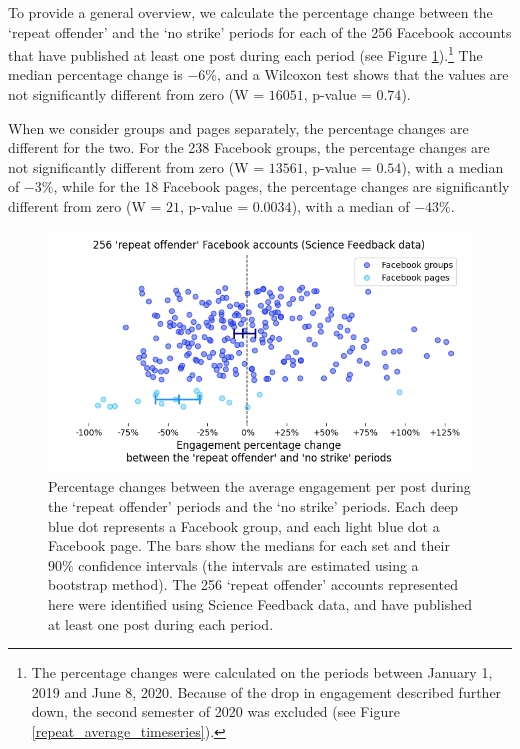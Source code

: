 \documentclass[review]{elsarticle}
\begin{document}
To provide a general overview, we calculate the percentage change between the `repeat offender' and the `no strike' periods for each of the 256 Facebook accounts that have published at least one post during each period (see Figure \ref{repeat_vs_free_percentage_change}).\footnote{The percentage changes were calculated on the periods between January 1, 2019 and June 8, 2020. Because of the drop in engagement described further down, the second semester of 2020 was excluded (see Figure \ref{repeat_average_timeseries}).}
The median percentage change is $-6\%$, and a Wilcoxon test shows that the values are not significantly different from zero (W = $16051$, p-value = $0.74$).

When we consider groups and pages separately, the percentage changes are different for the two.
For the 238 Facebook groups, the percentage changes are not significantly different from zero (W = $13561$, p-value = $0.54$), with a median of $-3\%$, while for the 18 Facebook pages, the percentage changes are significantly different from zero (W = $21$, p-value = $0.0034$), with a median of $-43\%$.

\begin{figure}[!h]
\centering
\includegraphics[scale=0.5]{./../figure/sf_repeat_vs_free_percentage_change.png}
\caption{
Percentage changes between the average engagement per post during the `repeat offender' periods and the `no strike' periods.
Each deep blue dot represents a Facebook group, and each light blue dot a Facebook page.
The bars show the medians for each set and their $90\%$ confidence intervals (the intervals are estimated using a bootstrap method).
The 256 `repeat offender' accounts represented here were identified using Science Feedback data, and have published at least one post during each period.
}
\label{repeat_vs_free_percentage_change}
\end{figure}
\end{document}
